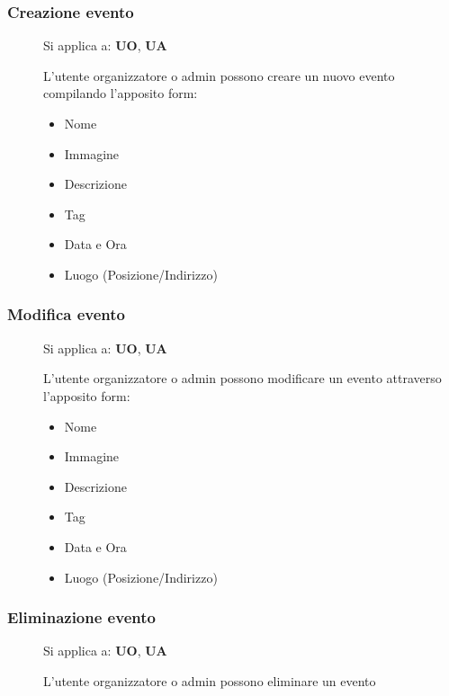 \documentclass{article}
\begin{document}
\subsubsection{Creazione evento} \label{rf_5}
\begin{description}
    \item[] Si applica a: \textbf{UO}, \textbf{UA}
    \item[] L'utente organizzatore o admin possono creare un nuovo evento compilando l'apposito form:
        \begin{itemize}
            \item Nome
            \item Immagine
            \item Descrizione
            \item Tag
            \item Data e Ora
            \item Luogo (Posizione/Indirizzo)
        \end{itemize}
\end{description}
\subsubsection{Modifica evento} \label{rf_6}
\begin{description}
    \item[] Si applica a: \textbf{UO}, \textbf{UA}
    \item[] L'utente organizzatore o admin possono modificare un evento attraverso l'apposito form:
        \begin{itemize}
            \item Nome
            \item Immagine
            \item Descrizione
            \item Tag
            \item Data e Ora
            \item Luogo (Posizione/Indirizzo)
        \end{itemize}
\end{description}
\subsubsection{Eliminazione evento} \label{rf_7}
\begin{description}
    \item[] Si applica a: \textbf{UO}, \textbf{UA}
    \item[] L'utente organizzatore o admin possono eliminare un evento
\end{description}
\end{document}
